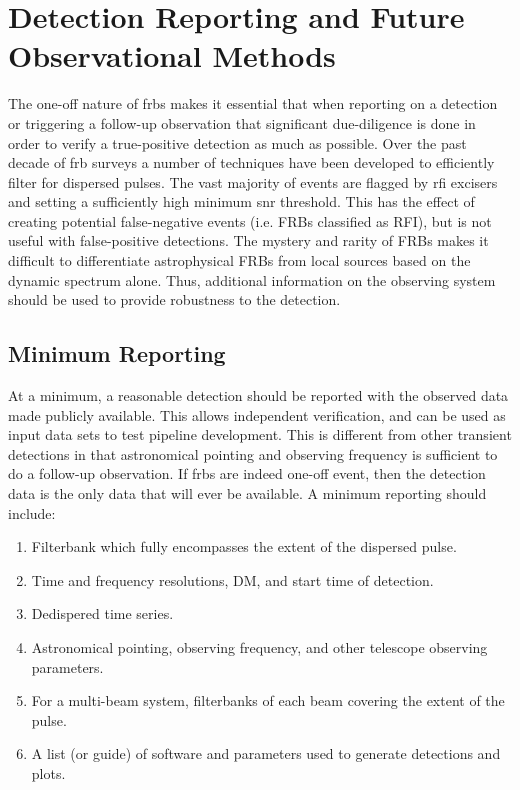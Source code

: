 \documentclass[a4paper,fleqn,usenatbib]{mnras}
\begin{document}
\section{Detection Reporting and Future Observational Methods}


The one-off nature of \glspl{frb} makes it essential that when reporting on a
detection or triggering a follow-up observation that significant due-diligence
is done in order to verify a true-positive detection as much as possible. Over the
past decade of \gls{frb} surveys a number of techniques have been developed to
efficiently filter for dispersed pulses. The vast majority of events are flagged
by \gls{rfi} excisers and setting a sufficiently high minimum \gls{snr}
threshold. This has the effect of creating potential false-negative events (i.e.
FRBs classified as RFI), but is not useful with false-positive detections. The
mystery and rarity of FRBs makes it difficult to differentiate astrophysical FRBs
from local sources based on the dynamic spectrum alone. Thus, additional
information on the observing system should be used to provide robustness to the
detection.

\subsection{Minimum Reporting}

At a minimum, a reasonable detection should be reported with the observed data
made publicly available.  This allows independent verification, and can be used
as input data sets to test pipeline development.  This is different from other
transient detections in that astronomical pointing and observing frequency is
sufficient to do a follow-up observation. If \glspl{frb} are indeed one-off
event, then the detection data is the only data that will ever be available. A
minimum reporting should include:

\begin{enumerate}
    \item Filterbank which fully encompasses the extent of the dispersed pulse.
    \item Time and frequency resolutions, DM, and start time of detection.
    \item Dedispered time series.
    \item Astronomical pointing, observing frequency, and other telescope
    observing parameters.
    \item For a multi-beam system, filterbanks of each beam covering the extent
    of the pulse.
    \item A list (or guide) of software and parameters used to generate
    detections and plots.
\end{enumerate}
\end{document}
